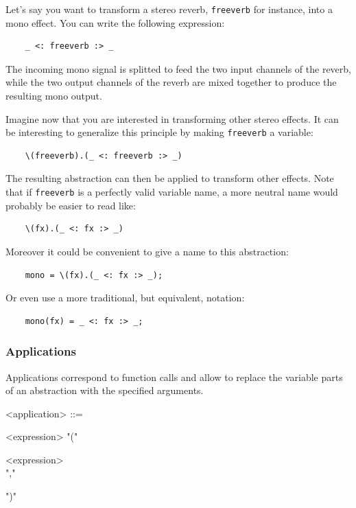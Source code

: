 \documentclass[a4paper,10pt]{book}
\begin{document}
Let's say you want to transform a stereo reverb, \lstinline'freeverb' for instance, into a mono effect. You can write the following expression: 
\begin{lstlisting}
	_ <: freeverb :> _ 
\end{lstlisting}
The incoming mono signal is splitted to feed the two input channels of the reverb, while the two output channels of the reverb are mixed together to produce the resulting mono output.

Imagine now that you are interested in transforming other stereo effects. It can be interesting to generalize this principle by making \lstinline'freeverb' a variable: 
\begin{lstlisting}
	\(freeverb).(_ <: freeverb :> _)
\end{lstlisting}

The resulting abstraction can then be applied to transform other effects. Note that if \lstinline'freeverb' is a perfectly valid variable name, a more neutral name would probably be easier to read like:
\begin{lstlisting}
	\(fx).(_ <: fx :> _)
\end{lstlisting}
 
Moreover it could be convenient to give a name to this abstraction:
\begin{lstlisting}
	mono = \(fx).(_ <: fx :> _);
\end{lstlisting}

Or even use a more traditional, but equivalent, notation:
\begin{lstlisting}
	mono(fx) = _ <: fx :> _;
\end{lstlisting}


\subsubsection{Applications}
Applications correspond to function calls and allow to replace the variable parts of an abstraction with the specified arguments.

\begin{grammar}
  <application> ::= 
  \begin{syntdiag}
    <expression> "(" 
    \begin{rep}
      <expression> \\ ","
    \end{rep}
    ")"
  \end{syntdiag}
\end{grammar}
\end{document}
